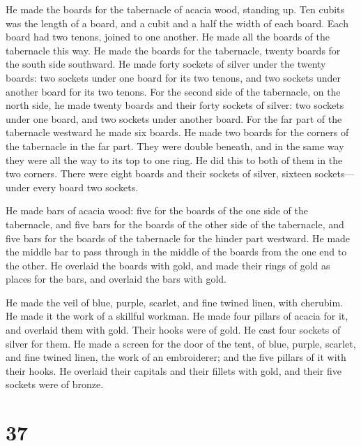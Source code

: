  He made the boards for the tabernacle of acacia wood,
standing up.  Ten cubits was the length of a board, and a
cubit and a half the width of each board.  Each board had
two tenons, joined to one another. He made all the boards of the
tabernacle this way.  He made the boards for the
tabernacle, twenty boards for the south side southward. 
He made forty sockets of silver under the twenty boards: two sockets
under one board for its two tenons, and two sockets under another board
for its two tenons.  For the second side of the
tabernacle, on the north side, he made twenty boards  and
their forty sockets of silver: two sockets under one board, and two
sockets under another board.  For the far part of the
tabernacle westward he made six boards.  He made two
boards for the corners of the tabernacle in the far part.
 They were double beneath, and in the same way they were
all the way to its top to one ring. He did this to both of them in the
two corners.  There were eight boards and their sockets
of silver, sixteen sockets---under every board two sockets.

 He made bars of acacia wood: five for the boards of the
one side of the tabernacle,  and five bars for the boards
of the other side of the tabernacle, and five bars for the boards of the
tabernacle for the hinder part westward.  He made the
middle bar to pass through in the middle of the boards from the one end
to the other.  He overlaid the boards with gold, and made
their rings of gold as places for the bars, and overlaid the bars with
gold.

 He made the veil of blue, purple, scarlet, and fine
twined linen, with cherubim. He made it the work of a skillful workman.
 He made four pillars of acacia for it, and overlaid them
with gold. Their hooks were of gold. He cast four sockets of silver for
them.  He made a screen for the door of the tent, of
blue, purple, scarlet, and fine twined linen, the work of an
embroiderer;  and the five pillars of it with their
hooks. He overlaid their capitals and their fillets with gold, and their
five sockets were of bronze.

\hypertarget{section-36}{%
\section{37}\label{section-36}}

